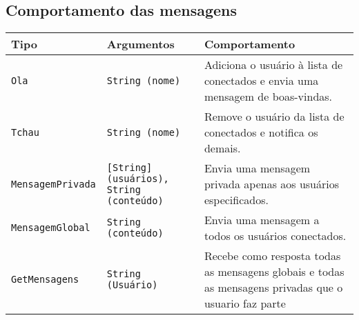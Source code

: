 \documentclass{article}
\begin{document}
{{        \subsection{Comportamento das mensagens}
        {
            \begin{table}[h!]
                \centering
                \begin{tabular}{|p{4.8cm}|p{4.8cm}|p{4.8cm}|}
                    \hline
                    \textbf{Tipo} & \textbf{Argumentos} & \textbf{Comportamento} \\
                    \hline
                    \texttt{Ola} & \texttt{String (nome)} & Adiciona o usuário à lista de conectados e envia uma mensagem de boas-vindas. \\
                    \hline
                    \texttt{Tchau} & \texttt{String (nome)} & Remove o usuário da lista de conectados e notifica os demais. \\
                    \hline
                    \texttt{MensagemPrivada} & \texttt{[String] (usuários), String (conteúdo)} & Envia uma mensagem privada apenas aos usuários especificados. \\
                    \hline
                    \texttt{MensagemGlobal} & \texttt{String (conteúdo)} & Envia uma mensagem a todos os usuários conectados. \\
                    \hline
                    \texttt{GetMensagens} & \texttt{String (Usuário)} & Recebe como resposta todas as mensagens globais e todas as mensagens privadas que o usuario faz parte\\
                    \hline
                \end{tabular}
            \end{table}
        }
            

    }
}
\end{document}
